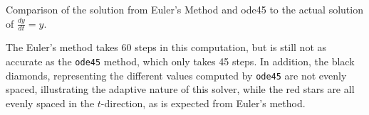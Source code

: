 \documentclass{ximera}
\begin{document}
\begin{myfig}
    \capstart
    \caption{Comparison of the solution from Euler's Method and ode45 to the actual solution of $\frac{dy}{dt} = y$.\label{numSols:fig}}
\end{myfig}

The Euler's method takes 60 steps in this computation, but is still not as accurate as the \texttt{ode45} method, which only takes 45 steps. In addition, the black diamonds, representing the different values computed by \texttt{ode45} are not evenly spaced, illustrating the adaptive nature of this solver, while the red stars are all evenly spaced in the $t$-direction, as is expected from Euler's method.
\end{document}
